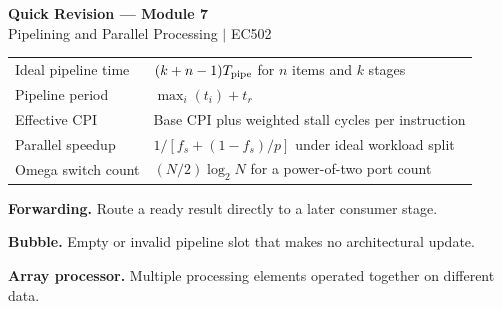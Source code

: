\documentclass[12pt,a4paper]{article}
\renewcommand{\arraystretch}{1.45}
\begin{document}
\newpage
\begin{center}
  {\large\bfseries\color{myred} Quick Revision --- Module 7}\\[3pt]
  {\small\color{mydark} Pipelining and Parallel Processing $|$ EC502}
\end{center}
\noindent{\color{myred}\rule{\linewidth}{1.2pt}}
\begin{tcolorbox}[formulabox,title={Key Formulas at a Glance}]
\renewcommand{\arraystretch}{1.35}
\begin{tabularx}{\linewidth}{B{5.0cm}Y}
Ideal pipeline time & $(k+n-1)T_{\rm pipe}$ for $n$ items and $k$ stages \\[3pt]
Pipeline period & $\max_i(t_i)+t_r$ \\[3pt]
Effective CPI & Base CPI plus weighted stall cycles per instruction \\[3pt]
Parallel speedup & $1/[f_s+(1-f_s)/p]$ under ideal workload split \\[3pt]
Omega switch count & $(N/2)\log_2 N$ for a power-of-two port count \\[3pt]
\end{tabularx}
\end{tcolorbox}
\begin{tcolorbox}[defbox,title={One-Line Definitions}]
\textbf{Forwarding.} Route a ready result directly to a later consumer stage.\par
\textbf{Bubble.} Empty or invalid pipeline slot that makes no architectural update.\par
\textbf{Array processor.} Multiple processing elements operated together on different data.\par
\end{tcolorbox}
\end{document}
